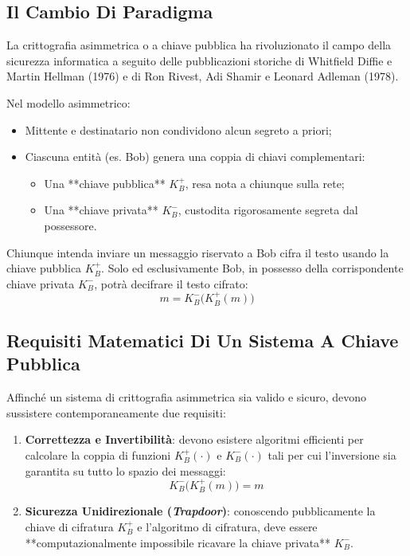 \documentclass[11pt, a4paper]{article}
\begin{document}
\subsection{Il Cambio Di Paradigma}

La crittografia asimmetrica o a chiave pubblica ha rivoluzionato il campo della sicurezza informatica a seguito delle pubblicazioni storiche di Whitfield Diffie e Martin Hellman (1976) e di Ron Rivest, Adi Shamir e Leonard Adleman (1978).


Nel modello asimmetrico:
\begin{itemize}[noitemsep]
    \item Mittente e destinatario non condividono alcun segreto a priori;
    \item Ciascuna entità (es. Bob) genera una coppia di chiavi complementari:
    \begin{itemize}
        \item Una **chiave pubblica** $K_B^+$, resa nota a chiunque sulla rete;
        \item Una **chiave privata** $K_B^-$, custodita rigorosamente segreta dal possessore.
    \end{itemize}
\end{itemize}


Chiunque intenda inviare un messaggio riservato a Bob cifra il testo usando la chiave pubblica $K_B^+$. Solo ed esclusivamente Bob, in possesso della corrispondente chiave privata $K_B^-$, potrà decifrare il testo cifrato:
\begin{equation}
m = K_B^-\bigl(K_B^+(m)\bigr)
\end{equation}

\subsection{Requisiti Matematici Di Un Sistema A Chiave Pubblica}

Affinché un sistema di crittografia asimmetrica sia valido e sicuro, devono sussistere contemporaneamente due requisiti:
\begin{enumerate}[leftmargin=*]
    \item \textbf{Correttezza e Invertibilità}: devono esistere algoritmi efficienti per calcolare la coppia di funzioni $K_B^+(\cdot)$ e $K_B^-(\cdot)$ tali per cui l'inversione sia garantita su tutto lo spazio dei messaggi:
    \[
    K_B^-\bigl(K_B^+(m)\bigr) = m
    \]
    \item \textbf{Sicurezza Unidirezionale (\emph{Trapdoor})}: conoscendo pubblicamente la chiave di cifratura $K_B^+$ e l'algoritmo di cifratura, deve essere **computazionalmente impossibile ricavare la chiave privata** $K_B^-$.
\end{enumerate}
\end{document}
